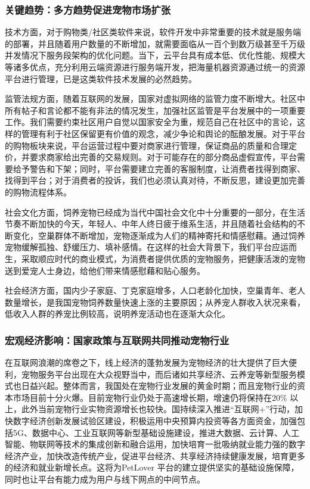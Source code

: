 \documentclass[a4paper]{ctexart}
\begin{document}
\subsubsection{关键趋势：多方趋势促进宠物市场扩张}

技术方面，对于购物类/社区类软件来说，软件开发中非常重要的技术就是服务端的部署，并且随着用户数量的不断增加，就需要面临从一百个到数万级甚至千万级并发情况下服务段架构的优化问题。当下，云平台具有成本低、优化性能、规模大等诸多优点，充分利用云端资源进行服务端开发，把海量机器资源通过统一的资源平台进行管理，已是这类软件技术发展的必然趋势。

监管法规方面，随着互联网的发展，国家对虚拟网络的监管力度不断增大。社区中所有帖子和言论都不能有非法的情况发生，加强社区监管是平台发展中的一项重要工作。我们需要约束社区用户自觉以国家安全为重，规范自己在社区中的言论，这样的管理有利于社区保留更有价值的观念，减少争论和舆论的酝酿发展。对于平台的购物板块来说，平台运营过程中要对商家进行管理，保证商品的质量和合理定价，并要求商家给出完善的交易规则。对于可能存在的部分商品虚假宣传，平台需要给予警告和下架；同时，平台需要建立完善的客服制度，让消费者找得到商家、找得到平台；对于消费者的投诉，我们也必须认真对待，不断反思，建设更加完善的购物流程体系。

社会文化方面，饲养宠物已经成为当代中国社会文化中十分重要的一部分，在生活节奏不断加快的今天，年轻人、中年人终日疲于维系生活，并且随着社会结构的不断变化，空巢群体不断增加，宠物逐渐成为人们的精神寄托和情感慰藉。通过饲养宠物缓解孤独、舒缓压力、填补感情。在这样的社会大背景下，我们平台应运而生，采取顺应时代的商业模式，为消费者提供优质的宠物服务，把健康活泼的宠物送到爱宠人士身边，给他们带来情感慰藉和贴心服务。

社会经济方面，国内少子家庭、丁克家庭增多，人口老龄化加快，空巢青年、老人数量增长，是我国宠物饲养数量快速上涨的主要原因；从养宠人群收入状况来看，低收入人群的养宠比例较高，说明养宠活动也在逐渐大众化。

\subsubsection{宏观经济影响：国家政策与互联网共同推动宠物行业}

在互联网浪潮的席卷之下，线上经济的蓬勃发展为宠物经济的壮大提供了巨大便利，宠物服务平台出现在大众视野当中，而后诸如共享经济、云养宠等新型服务模式也日益兴起。整体而言，我国处在宠物行业发展的黄金时期；而且宠物行业的资本市场目前十分火爆。目前宠物行业仍处于高速增长期，增速仍将保持在20\% 以上，此外当前宠物行业实物资源增长也较快。国持续深入推进“互联网+”行动，加快数字经济创新发展试验区建设，积极运用中央预算内投资等各方面资金，加强包括5G、数据中心、工业互联网等新型基础设施建设，推进大数据、云计算、人工智能、物联网等技术的集成创新和融合运用，加快培育一批吸纳就业能力强的数字经济产业，加快改造传统产业，促进平台经济、共享经济持续健康发展，培育更多的经济和就业新增长点。这将为PetLover 平台的建立提供坚实的基础设施保障，同时也让平台有能力成为用户与线下网点的中间节点。
\end{document}
